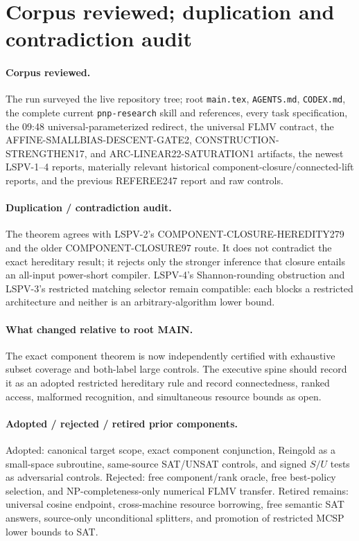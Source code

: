 \documentclass[11pt]{article}
\begin{document}
\section{Corpus reviewed; duplication and contradiction audit}
\paragraph{Corpus reviewed.}
The run surveyed the live repository tree; root \texttt{main.tex},
\texttt{AGENTS.md}, \texttt{CODEX.md}, the complete current
\texttt{pnp-research} skill and references, every task specification, the
09:48 universal-parameterized redirect, the universal FLMV contract, the
AFFINE-SMALLBIAS-DESCENT-GATE2, CONSTRUCTION-STRENGTHEN17, and
ARC-LINEAR22-SATURATION1 artifacts, the newest LSPV-1--4 reports, materially
relevant historical component-closure/connected-lift reports, and the previous
REFEREE247 report and raw controls.

\paragraph{Duplication / contradiction audit.}
The theorem agrees with LSPV-2's COMPONENT-CLOSURE-HEREDITY279 and the older
COMPONENT-CLOSURE97 route.  It does not contradict the exact hereditary result;
it rejects only the stronger inference that closure entails an all-input
power-short compiler.  LSPV-4's Shannon-rounding obstruction and LSPV-3's
restricted matching selector remain compatible: each blocks a restricted
architecture and neither is an arbitrary-algorithm lower bound.

\paragraph{What changed relative to root MAIN.}
The exact component theorem is now independently certified with exhaustive
subset coverage and both-label large controls.  The executive spine should
record it as an adopted restricted hereditary rule and record connectedness,
ranked access, malformed recognition, and simultaneous resource bounds as open.

\paragraph{Adopted / rejected / retired prior components.}
Adopted: canonical target scope, exact component conjunction, Reingold as a
small-space subroutine, same-source SAT/UNSAT controls, and signed $S/U$ tests as
adversarial controls.  Rejected: free component/rank oracle, free best-policy
selection, and NP-completeness-only numerical FLMV transfer.  Retired remains:
universal cosine endpoint, cross-machine resource borrowing, free semantic SAT
answers, source-only unconditional splitters, and promotion of restricted MCSP
lower bounds to SAT.
\end{document}
